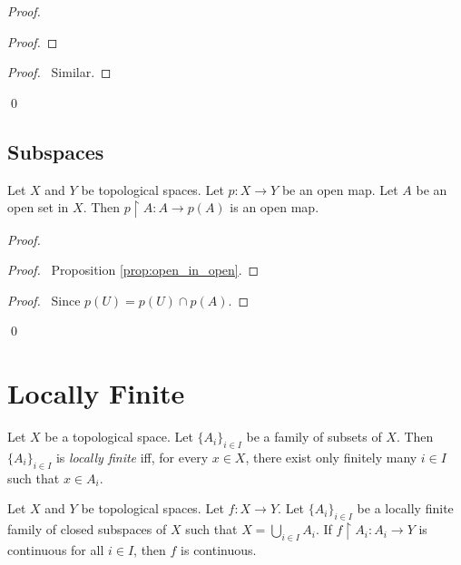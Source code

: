 \begin{proof}
\pf
{}
\begin{proof}
\end{proof}
\begin{proof}
	\pf\ Similar.
\end{proof}
\qed
\end{proof}

\subsection{Subspaces}

\begin{prop}
Let $X$ and $Y$ be topological spaces. Let $p : X \rightarrow Y$ be an open map. Let $A$ be an open set in $X$. Then $p \restriction A : A \rightarrow p(A)$ is an open map.
\end{prop}

\begin{proof}
\pf
{}
\begin{proof}
	\pf\ Proposition \ref{prop:open_in_open}.
\end{proof}
\begin{proof}
	\pf\ Since $p(U) = p(U) \cap p(A)$.
\end{proof}
\qed
\end{proof}

\section{Locally Finite}

\begin{df}
Let $X$ be a topological space. Let $\{A_i\}_{i \in I}$ be a family of subsets of $X$. Then $\{A_i\}_{i \in I}$ is \emph{locally finite} iff, for every $x \in X$, there exist only finitely many $i \in I$ such that $x \in A_i$.
\end{df}

\begin{thm}
Let $X$ and $Y$ be topological spaces. Let $f : X \rightarrow Y$. Let $\{A_i\}_{i \in I}$ be a locally finite family of closed subspaces of $X$ such that $X = \bigcup_{i \in I} A_i$. If $f \restriction A_i : A_i \rightarrow Y$ is continuous for all $i \in I$, then $f$ is continuous.
\end{thm}

